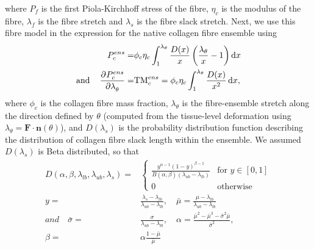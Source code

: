     where $P_f$ is the first Piola-Kirchhoff stress of the fibre, $\eta_c$ is the modulus of the fibre, $\lambda_f$ is the fibre stretch and $\lambda_s$ is the fibre slack stretch. Next, we use this fibre model in the expression for the native collagen fibre ensemble using
        \begin{equation}\label{c3:eqn:23}
        \begin{aligned}
        P_c^{ens} =& \phi_c\eta_c\int_1^{\lambda_\theta}\frac{D(x)}{x} \left(\frac{\lambda_\theta}{x} - 1\right) \dif x    \\
        \text{and} \quad \dpd{P_c^{ens}}{\lambda_\theta} =&\mathrm{TM}_c^{ens} = \phi_c\eta_c\int_1^{\lambda_\theta}\frac{D(x)}{x^2}\dif x,
        \end{aligned}
        \end{equation}
    where $\phi_c$ is the collagen fibre mass fraction, $\lambda_\theta$ is the fibre-ensemble stretch along the direction defined by $\theta$ (computed from the tissue-level deformation using $\lambda_\theta = \mathbf{F}\cdot\mathbf{n}(\theta)$), and $D(\lambda_s)$ is the probability distribution function describing the distribution of collagen fibre slack length within the ensemble. We assumed $D(\lambda_s)$ is Beta distributed, so that
        \begin{equation}\label{c3:eqn:24}
        \begin{aligned}
        D(\alpha, \beta, \lambda_{lb}, \lambda_{ub}, \lambda_s) =& 
            \begin{cases}
            \frac{y^{\alpha-1}(1-y)^{\beta-1}}{B(\alpha,\beta)(\lambda_{ub}-\lambda_{lb})} & \text{for } y \in [0,1] \\
            0 & \text{otherwise}
            \end{cases} \\
        y=&\frac{\lambda_s-\lambda_{lb}}{\lambda_{ub}- \lambda_{lb}}, \quad \bar{\mu} =\frac{\mu - \lambda_{lb}}{\lambda_{ub}-\lambda_{lb}}   \\
        and \quad \bar{\sigma} =& \frac{\sigma}{\lambda_{ub} - \lambda_{lb}}, \quad \alpha = \frac{\bar{\mu}^2 - \bar{\mu}^3 - \bar{\sigma}^2\bar{\mu}}{\bar{\sigma}^2},   \\
        \beta =& \alpha \frac{1-\bar{\mu}}{\bar{\mu}}
        \end{aligned}
        \end{equation}
